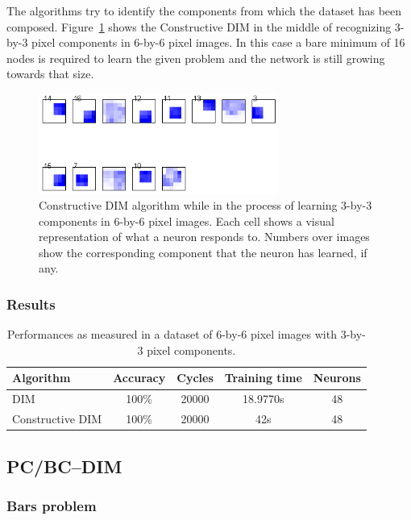 \documentclass[11pt,a4paper]{report}
\begin{document}
				The algorithms try to identify the components from which the dataset has been composed. Figure~\ref{fig:learning_squares} shows the Constructive DIM in the middle of recognizing 3-by-3 pixel components in 6-by-6 pixel images. In this case a bare minimum of 16 nodes is required to learn the given problem and the network is still growing towards that size.
				
				\begin{figure}[h]
					\centering
					\includegraphics[width=0.7\textwidth]{learning_squares}
					\caption{Constructive DIM algorithm while in the process of learning 3-by-3 components in 6-by-6 pixel images. Each cell shows a visual representation of what a neuron responds to. Numbers over images show the corresponding component that the neuron has learned, if any.}
					\label{fig:learning_squares}
				\end{figure}

				\subsubsection{Results}
				\begin{table}[h]
					\centering
					\begin{tabular}{l*{4}{c}}
						Algorithm         & Accuracy & Cycles & Training time & Neurons \\
						\hline
						DIM               & 100\%    & 20000  & 18.9770s      & 48      \\
						Constructive DIM  & 100\%    & 20000  & 42s           & 48      \\
					\end{tabular}
					\caption{Performances as measured in a dataset of 6-by-6 pixel images with 3-by-3 pixel components.}
					\label{tab:performance}
				\end{table}
				
			\subsection{PC/BC--DIM}
				\subsubsection{Bars problem}
				
\end{document}
